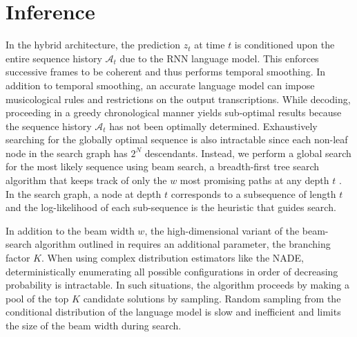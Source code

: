 \documentclass{article}
\begin{document}
\section{Inference}

In the hybrid architecture, the prediction $z_t$ at time $t$ is conditioned upon the entire sequence history $\mathcal A_t$ due to the RNN language model. This enforces successive frames to be coherent and thus performs temporal smoothing. In addition to temporal smoothing, an accurate language model can impose musicological rules and restrictions on the output transcriptions. While decoding, proceeding in a greedy chronological manner yields sub-optimal results because the sequence history $\mathcal A_t$ has not been optimally determined. Exhaustively searching for the globally optimal sequence is also intractable since each non-leaf node in the search graph has $2^{N}$ descendants. Instead, we perform a global search for the most likely sequence using beam search, a breadth-first tree search algorithm that keeps track of only the $w$ most promising paths at any depth $t$ \cite{graves2012sequence,boulanger2013high,boulangerphone}. In the search graph, a node at depth $t$ corresponds to a subsequence of length $t$ and the log-likelihood of each sub-sequence is the heuristic that guides search. 

In addition to the beam width $w$, the high-dimensional variant of the beam-search algorithm outlined in \cite{boulanger2013high} requires an additional parameter, the branching factor $K$. When using complex distribution estimators like the NADE, deterministically enumerating all possible configurations in order of decreasing probability is intractable. In such situations, the algorithm proceeds by making a pool of the top $K$ candidate solutions by sampling. Random sampling from the conditional distribution of the language model is slow and inefficient and limits the size of the beam width during search. 

\end{document}
